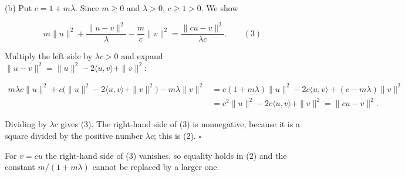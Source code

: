 \documentclass[11pt,a4paper]{report}
\begin{document}
(b) Put \(c=1+m\lambda\). Since \(m\ge0\) and \(\lambda>0\), \(c\ge1>0\). We show


\[m\|u\|^2+\frac{\|u-v\|^2}{\lambda}-\frac{m}{c}\|v\|^2=\frac{\|cu-v\|^2}{\lambda c}.\qquad(3)\]


Multiply the left side by \(\lambda c>0\) and expand \(\|u-v\|^2=\|u\|^2-2\langle u,v\rangle+\|v\|^2\):


\[\begin{aligned}
m\lambda c\|u\|^2+c\bigl(\|u\|^2-2\langle u,v\rangle+\|v\|^2\bigr)-m\lambda\|v\|^2
&=c(1+m\lambda)\|u\|^2-2c\langle u,v\rangle+(c-m\lambda)\|v\|^2\\
&=c^2\|u\|^2-2c\langle u,v\rangle+\|v\|^2=\|cu-v\|^2 .
\end{aligned}\]


Dividing by \(\lambda c\) gives (3). The right-hand side of (3) is nonnegative, because it is a square divided by the positive number \(\lambda c\); this is (2). \(\square\)




For \(v=cu\) the right-hand side of (3) vanishes, so equality holds in (2) and the constant \(m/(1+m\lambda)\) cannot be replaced by a larger one.
\end{document}
